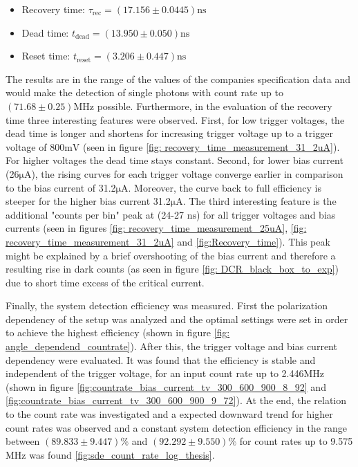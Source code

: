 \begin{itemize}
    \item Recovery time: $\tau_{\text{rec}} = (17.156 \pm 0.0445) \si{\nano \s}$
    \item Dead time: $t_{\text{dead}} =  (13.950 \pm 0.050) \si{\nano \s}$
    \item Reset time: $t_{\text{reset}} = (3.206 \pm 0.447) \si{\nano \s}$
\end{itemize}

The results are in the range of the values of the companies specification data \cite{tech_sheet_single_quantum} and would make the
detection of single photons with count rate up to  $(71.68 \pm 0.25)\si{\mega \Hz} $ possible.
Furthermore, in the evaluation of the recovery time three interesting features were observed.
First, for low trigger voltages, the dead time is longer and shortens for increasing trigger voltage up to a trigger voltage of
800$\si{\milli \V}$ (seen in figure \ref{fig: recovery_time_measurement_31_2uA}).
For higher voltages the dead time stays constant.
Second, for lower bias current (26$\si{\micro \A}$), the rising curves for each trigger voltage converge earlier in comparison
to the bias current of 31.2$\si{\micro \A}$.
Moreover, the curve back to full efficiency is steeper for the higher bias current 31.2$\si{\micro \A}$.
The third interesting feature is the additional "counts per bin" peak at (24-27 $\si{\nano \s}$) for all trigger voltages and
bias currents (seen in figures \ref{fig: recovery_time_measurement_25uA}, \ref{fig: recovery_time_measurement_31_2uA} and \ref{fig:Recovery_time}).
This peak might be explained by a brief overshooting of the bias current and therefore a resulting rise in dark counts
(as seen in figure \ref{fig: DCR_black_box_to_exp}) due to short time excess of the critical current.

Finally, the system detection efficiency was measured.
First the polarization dependency of the setup was analyzed and the optimal settings were set in order to achieve the highest efficiency (shown in figure \ref{fig: angle_dependend_countrate}).
After this, the trigger voltage and bias current dependency were evaluated.
It was found that the efficiency is stable and independent of the trigger voltage, for an input count rate up to
2.446$\si{\mega \Hz}$ (shown in figure \ref{fig:countrate_bias_current_tv_300_600_900_8_92} and \ref{fig:countrate_bias_current_tv_300_600_900_9_72}).
At the end, the relation to the count rate was investigated and a expected downward trend for higher count rates was observed and
a constant system detection efficiency in the range between $(89.833 \pm 9.447) \%$ and $(92.292 \pm 9.550) \%$ for count rates up to
9.575 $\si{\mega \Hz}$ was found \ref{fig:sde_count_rate_log_thesis}. \\

